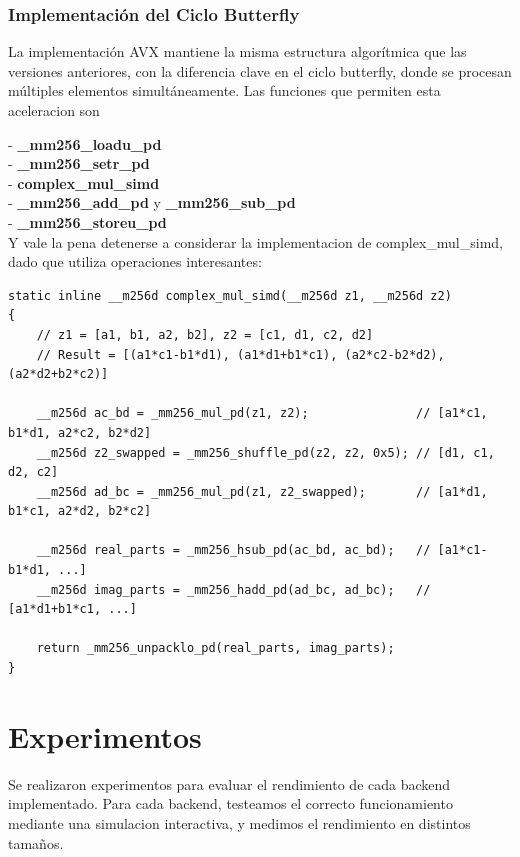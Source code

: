\documentclass[a4paper]{article}
\begin{document}
\subsubsection{Implementación del Ciclo Butterfly}

La implementación AVX mantiene la misma estructura algorítmica que las versiones anteriores, con la diferencia clave en el ciclo butterfly, donde se procesan
múltiples elementos simultáneamente. Las funciones que permiten esta aceleracion son

- \textbf{\_mm256\_loadu\_pd}\\
- \textbf{\_mm256\_setr\_pd} \\
- \textbf{complex\_mul\_simd}\\
- \textbf{\_mm256\_add\_pd} y \textbf{\_mm256\_sub\_pd}\\
- \textbf{\_mm256\_storeu\_pd}\\

Y vale la pena detenerse a considerar la implementacion de complex\_mul\_simd, dado que utiliza operaciones interesantes:
\begin{verbatim}
static inline __m256d complex_mul_simd(__m256d z1, __m256d z2)
{
    // z1 = [a1, b1, a2, b2], z2 = [c1, d1, c2, d2]
    // Result = [(a1*c1-b1*d1), (a1*d1+b1*c1), (a2*c2-b2*d2), (a2*d2+b2*c2)]
    
    __m256d ac_bd = _mm256_mul_pd(z1, z2);               // [a1*c1, b1*d1, a2*c2, b2*d2]
    __m256d z2_swapped = _mm256_shuffle_pd(z2, z2, 0x5); // [d1, c1, d2, c2]
    __m256d ad_bc = _mm256_mul_pd(z1, z2_swapped);       // [a1*d1, b1*c1, a2*d2, b2*c2]
    
    __m256d real_parts = _mm256_hsub_pd(ac_bd, ac_bd);   // [a1*c1-b1*d1, ...]
    __m256d imag_parts = _mm256_hadd_pd(ad_bc, ad_bc);   // [a1*d1+b1*c1, ...]
    
    return _mm256_unpacklo_pd(real_parts, imag_parts);
}
\end{verbatim}

\section{Experimentos}

Se realizaron experimentos para evaluar el rendimiento de cada backend implementado. Para cada backend, testeamos el correcto funcionamiento mediante una simulacion interactiva, y medimos
el rendimiento en distintos tamaños.
\end{document}

